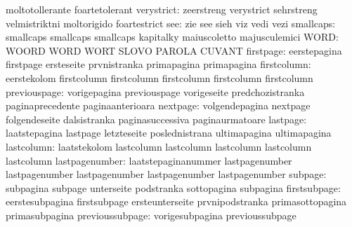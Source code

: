                            moltotollerante           foartetolerant
               verystrict: zeerstreng                verystrict
                           sehrstreng                velmistriktni
                           moltorigido               foartestrict %
                      see: zie                       see
                           sieh                      viz
                           vedi                      vezi
                smallcaps: smallcaps                 smallcaps
                           smallcaps                 kapitalky
                           maiuscoletto              majusculemici
                     WORD: WOORD                     WORD
                           WORT                      SLOVO
                           PAROLA                    CUVANT
                firstpage: eerstepagina              firstpage
                           ersteseite                prvnistranka
                           primapagina               primapagina
              firstcolumn: eerstekolom               firstcolumn
                           firstcolumn               firstcolumn
                           firstcolumn               firstcolumn
             previouspage: vorigepagina              previouspage
                           vorigeseite               predchozistranka
                           paginaprecedente          paginaanterioara
                 nextpage: volgendepagina            nextpage
                           folgendeseite             dalsistranka
                           paginasuccessiva          paginaurmatoare
                 lastpage: laatstepagina             lastpage
                           letzteseite               poslednistrana
                           ultimapagina              ultimapagina
               lastcolumn: laatstekolom              lastcolumn
                           lastcolumn                lastcolumn
                           lastcolumn                lastcolumn
           lastpagenumber: laatstepaginanummer       lastpagenumber
                           lastpagenumber            lastpagenumber
                           lastpagenumber            lastpagenumber
                  subpage: subpagina                 subpage
                           unterseite                podstranka
                           sottopagina               subpagina
             firstsubpage: eerstesubpagina           firstsubpage
                           ersteunterseite           prvnipodstranka
                           primasottopagina          primasubpagina
          previoussubpage: vorigesubpagina           previoussubpage
